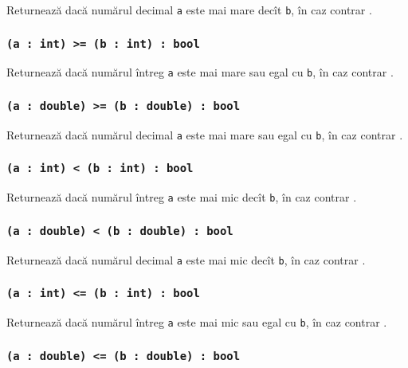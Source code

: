 Returnează \true{} dacă numărul decimal \texttt{a} este mai mare decît \texttt{b}, în caz contrar \false{}.

\subsubsection{\texttt{(a : int) >= (b : int) : bool}}

Returnează \true{} dacă numărul întreg \texttt{a} este mai mare sau egal cu \texttt{b}, în caz contrar \false{}.

\subsubsection{\texttt{(a : double) >= (b : double) : bool}}

Returnează \true{} dacă numărul decimal \texttt{a} este mai mare sau egal cu \texttt{b}, în caz contrar \false{}.

\subsubsection{\texttt{(a : int) < (b : int) : bool}}

Returnează \true{} dacă numărul întreg \texttt{a} este mai mic decît \texttt{b}, în caz contrar \false{}.

\subsubsection{\texttt{(a : double) < (b : double) : bool}}

Returnează \true{} dacă numărul decimal \texttt{a} este mai mic decît \texttt{b}, în caz contrar \false{}.

\subsubsection{\texttt{(a : int) <= (b : int) : bool}}

Returnează \true{} dacă numărul întreg \texttt{a} este mai mic sau egal cu \texttt{b}, în caz contrar \false{}.

\subsubsection{\texttt{(a : double) <= (b : double) : bool}}


